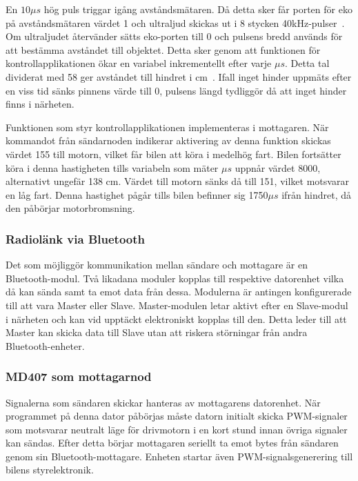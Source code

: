 \documentclass[a4paper]{article}
\begin{document}
\vspace{5mm} \noindent
En $10\mu s$ hög puls triggar igång avståndsmätaren. Då detta sker får porten för eko på avståndsmätaren värdet 1 och ultraljud skickas ut i 8 stycken 40kHz-pulser~\cite{DistMeasure}. Om ultraljudet återvänder sätts eko-porten till 0 och pulsens bredd används för att bestämma avståndet till objektet. Detta sker genom att funktionen för kontrollapplikationen ökar en variabel inkrementellt efter varje $\mu s$. Detta tal dividerat med 58 ger avståndet till hindret i cm~\cite{DistMeasure}. Ifall inget hinder uppmäts efter en viss tid sänks pinnens värde till 0, pulsens längd tydliggör då att inget hinder finns i närheten.


\newpage
\noindent
Funktionen som styr kontrollapplikationen implementeras i mottagaren. När kommandot från sändarnoden indikerar aktivering av denna funktion skickas värdet 155 till motorn, vilket får bilen att köra i medelhög fart. Bilen fortsätter köra i denna hastigheten tills variabeln som mäter $\mu s$ uppnår värdet 8000, alternativt ungefär 138 cm. Värdet till motorn sänks då till 151, vilket motsvarar en låg fart. Denna hastighet pågår tills bilen befinner sig 1750$\mu s$ ifrån hindret, då den påbörjar motorbromsning.


\subsubsection{Radiolänk via Bluetooth}
Det som möjliggör kommunikation mellan sändare och mottagare är en Bluetooth-modul. Två likadana moduler kopplas till respektive datorenhet vilka då kan sända samt ta emot data från dessa. Modulerna är antingen konfigurerade till att vara Master eller Slave. Master-modulen letar aktivt efter en Slave-modul i närheten och kan vid upptäckt elektroniskt kopplas till den. Detta leder till att Master kan skicka data till Slave utan att riskera störningar från andra Bluetooth-enheter.


\subsubsection{MD407 som mottagarnod}
Signalerna som sändaren skickar hanteras av mottagarens datorenhet. När programmet på denna dator påbörjas måste datorn initialt skicka PWM-signaler som motsvarar neutralt läge för drivmotorn i en kort stund innan övriga signaler kan sändas. Efter detta börjar mottagaren seriellt ta emot bytes från sändaren genom sin Bluetooth-mottagare. Enheten startar även PWM-signalsgenerering till bilens styrelektronik. 
\end{document}
